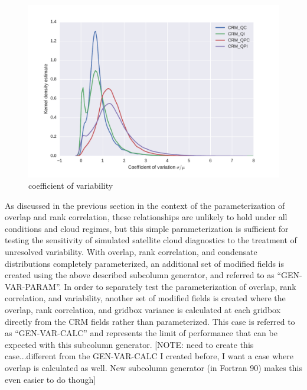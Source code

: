 \begin{figure}
\centering
\includegraphics[width=\columnwidth]{graphics/coefficient_of_variation.pdf}
\caption{coefficient of variability}
\label{sgi_coefficient_of_variation}
\end{figure}

As discussed in the previous section in the context of the parameterization of overlap and rank correlation, these relationships are unlikely to hold under all conditions and cloud regimes, but this simple parameterization is sufficient for testing the sensitivity of simulated satellite cloud diagnostics to the treatment of unresolved variability. With overlap, rank correlation, and condensate distributions completely parameterized, an additional set of modified fields is created using the above described subcolumn generator, and referred to as ``GEN-VAR-PARAM''. In order to separately test the parameterization of overlap, rank correlation, and variability, another set of modified fields is created where the overlap, rank correlation, and gridbox variance is calculated at each gridbox directly from the CRM fields rather than parameterized. This case is referred to as ``GEN-VAR-CALC'' and represents the limit of performance that can be expected with this subcolumn generator. [NOTE: need to create this case...different from the GEN-VAR-CALC I created before, I want a case where overlap is calculated as well. New subcolumn generator (in Fortran 90) makes this even easier to do though]

